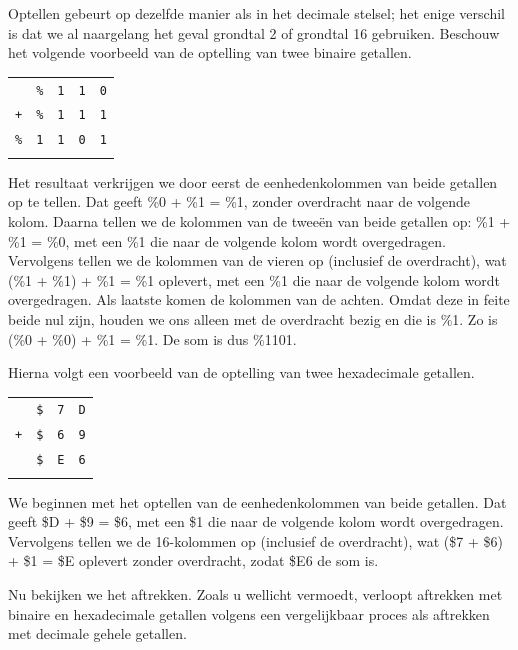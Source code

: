 Optellen gebeurt op dezelfde manier als in het decimale stelsel; het enige verschil is dat we al naargelang het geval grondtal 2 of grondtal 16 gebruiken. Beschouw het volgende voorbeeld van de optelling van twee binaire getallen.
\begin{center}
	\begin{tabular}{ccccc}
               & \texttt{\%} & \texttt{1} & \texttt{1} & \texttt{0} \\    \texttt{+} & \texttt{\%} & \texttt{1} & \texttt{1} & \texttt{1} \\ \hline    \texttt{\%} & \texttt{1} & \texttt{1} & \texttt{0} & \texttt{1} \\ \hhline{=====}
	\end{tabular}
\end{center}

Het resultaat verkrijgen we door eerst de eenhedenkolommen van beide getallen op te tellen. Dat geeft \%0 + \%1 = \%1, zonder overdracht naar de volgende kolom. Daarna tellen we de kolommen van de tweeën van beide getallen op: \%1 + \%1 = \%0, met een \%1 die naar de volgende kolom wordt overgedragen. Vervolgens tellen we de kolommen van de vieren op (inclusief de overdracht), wat (\%1 + \%1) + \%1 = \%1 oplevert, met een \%1 die naar de volgende kolom wordt overgedragen. Als laatste komen de kolommen van de achten. Omdat deze in feite beide nul zijn, houden we ons alleen met de overdracht bezig en die is \%1. Zo is (\%0 + \%0) + \%1 = \%1. De som is dus \%1101.

Hierna volgt een voorbeeld van de optelling van twee hexadecimale getallen.
\begin{center}
	\begin{tabular}{cccc}
						 & \texttt{\$} & \texttt{7} & \texttt{D} \\	\texttt{+} & \texttt{\$} & \texttt{6} & \texttt{9} \\ \hline             & \texttt{\$} & \texttt{E} & \texttt{6} \\ \hhline{====}
	\end{tabular}
\end{center}

We beginnen met het optellen van de eenhedenkolommen van beide getallen. Dat geeft \$D + \$9 = \$6, met een \$1 die naar de volgende kolom wordt overgedragen. Vervolgens tellen we de 16-kolommen op (inclusief de overdracht), wat (\$7 + \$6) + \$1 = \$E oplevert zonder overdracht, zodat \$E6 de som is.

Nu bekijken we het aftrekken. Zoals u wellicht vermoedt, verloopt aftrekken met binaire en hexadecimale getallen volgens een vergelijkbaar proces als aftrekken met decimale gehele getallen.


